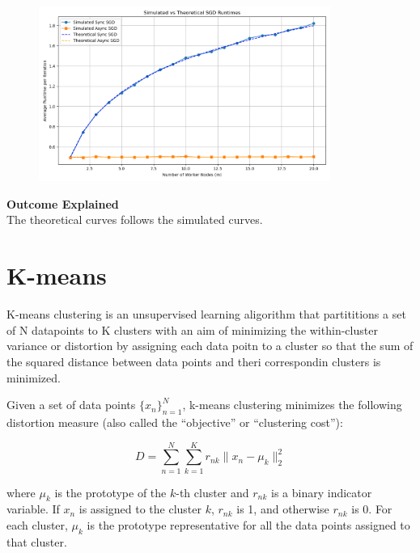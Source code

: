 \documentclass{article}
\begin{document}
\begin{enumerate}
    \begin{figure}[H]
        \centering
        \includegraphics[width=0.85\textwidth]{SGD_simulation_theory.png}
        \label{fig:sgd_simulation_theory}
    \end{figure}

    \textbf{Outcome Explained}\\
    The theoretical curves follows the simulated curves.
\end{enumerate}

\clearpage

\section{K-means}
K-means clustering is an unsupervised learning aligorithm that partititions a set of N datapoints to K clusters with an aim of minimizing the within-cluster variance or distortion
by assigning each data poitn to a cluster so that the sum of the squared distance between data points and theri correspondin clusters is minimized.





Given a set of data points $\{x_n\}_{n=1}^N$, k-means clustering minimizes the following distortion measure (also called the ``objective'' or ``clustering cost''):



\[
D = \sum_{n=1}^N \sum_{k=1}^K r_{nk} \|x_n - \mu_k\|_2^2
\]



where $\mu_k$ is the prototype of the $k$-th cluster and $r_{nk}$ is a binary indicator variable. If $x_n$ is assigned to the cluster $k$, $r_{nk}$ is 1, and otherwise $r_{nk}$ is 0. For each cluster, $\mu_k$ is the prototype representative for all the data points assigned to that cluster.
\end{document}
